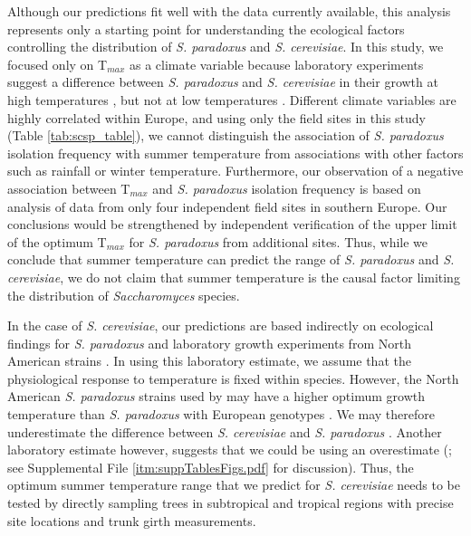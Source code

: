 \documentclass[12pt]{article}
\begin{document}
\begin{linenumbers}
Although our predictions fit well with the data currently available, this analysis represents only a starting point for understanding the ecological factors controlling the distribution of \textit{S. paradoxus} and \textit{S. cerevisiae}. In this study, we focused only on T$_{max}$ as a climate variable because laboratory experiments suggest a difference between \textit{S. paradoxus} and \textit{S. cerevisiae} in their growth at high temperatures \citep{sweeney_sympatric_2004,liti_population_2009,salvado_temperature_2011,leducq_local_2014}, but not at low temperatures \citep{sweeney_sympatric_2004,will_incipient_2010,salvado_temperature_2011}. Different climate variables are highly correlated within Europe, and using only the field sites in this study (Table \ref{tab:scsp_table}), we cannot distinguish the association of \textit{S. paradoxus} isolation frequency with summer temperature from associations with other factors such as rainfall or winter temperature. Furthermore, our observation of a negative association between T$_{max}$ and \textit{S. paradoxus} isolation frequency is based on analysis of data from only four independent field sites in southern Europe. Our conclusions would be strengthened by independent verification of the upper limit of the optimum T$_{max}$ for \textit{S. paradoxus} from additional sites. Thus, while we conclude that summer temperature can predict the range of \textit{S. paradoxus} and \textit{S. cerevisiae}, we do not claim that summer temperature is the causal factor limiting the distribution of \textit{Saccharomyces} species.

In the case of \textit{S. cerevisiae}, our predictions are based indirectly on ecological findings for \textit{S. paradoxus} and laboratory growth experiments from North American strains \citep{sweeney_sympatric_2004}. In using this laboratory estimate, we assume that the physiological response to temperature is fixed within species. However, the North American \textit{S. paradoxus} strains used by \citet{sweeney_sympatric_2004} may have a higher optimum growth temperature than \textit{S. paradoxus} with European genotypes \citep{leducq_local_2014}. We may therefore underestimate the difference between \textit{S. cerevisiae} and \textit{S. paradoxus} \citep{leducq_local_2014}. Another laboratory estimate however, suggests that we could be using an overestimate (\citealp{salvado_temperature_2011}; see Supplemental File \ref{itm:suppTablesFigs.pdf} for discussion). Thus, the optimum summer temperature range that we predict for \textit{S. cerevisiae} needs to be tested by directly sampling trees in subtropical and tropical regions with precise site locations and trunk girth measurements. 


\end{linenumbers}
\end{document}
